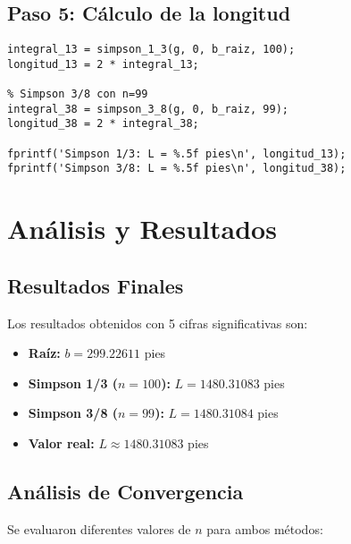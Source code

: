 \documentclass[conference]{IEEEtran}
\begin{document}
\subsection{Paso 5: Cálculo de la longitud}

\begin{lstlisting}[caption={Calcular longitud con ambos métodos}]
% Simpson 1/3 con n=100
integral_13 = simpson_1_3(g, 0, b_raiz, 100);
longitud_13 = 2 * integral_13;

% Simpson 3/8 con n=99
integral_38 = simpson_3_8(g, 0, b_raiz, 99);
longitud_38 = 2 * integral_38;

fprintf('Simpson 1/3: L = %.5f pies\n', longitud_13);
fprintf('Simpson 3/8: L = %.5f pies\n', longitud_38);
\end{lstlisting}

\section{Análisis y Resultados}

\subsection{Resultados Finales}

Los resultados obtenidos con 5 cifras significativas son:

\begin{itemize}
    \item \textbf{Raíz:} $b = 299.22611$ pies
    \item \textbf{Simpson 1/3 ($n=100$):} $L = 1480.31083$ pies
    \item \textbf{Simpson 3/8 ($n=99$):} $L = 1480.31084$ pies
    \item \textbf{Valor real:} $L \approx 1480.31083$ pies
\end{itemize}

\subsection{Análisis de Convergencia}

Se evaluaron diferentes valores de $n$ para ambos métodos:
\end{document}
